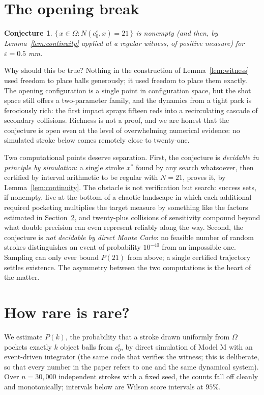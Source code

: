 \documentclass[11pt]{article}
\newtheorem{conjecture}{Conjecture}
\theoremstyle{definition}
\theoremstyle{remark}
\newcommand{\OO}{\Omega}
\begin{document}
\section{The opening break}
\label{sec:break}

\begin{conjecture}
\label{conj:break}
$\{\, x \in \OO : N(c_0^{\varepsilon}, x) = 21 \,\}$ is nonempty
(and then, by Lemma~\ref{lem:continuity} applied at a regular
witness, of positive measure) for $\varepsilon = 0.5$ mm.
\end{conjecture}

Why should this be true? Nothing in the construction of
Lemma~\ref{lem:witness} used freedom to place balls generously; it
used freedom to place them exactly. The opening configuration is a
single point in configuration space, but the shot space still offers
a two-parameter family, and the dynamics from a tight pack is
ferociously rich: the first impact sprays fifteen reds into a
recirculating cascade of secondary collisions. Richness is not a
proof, and we are honest that the conjecture is open even at the
level of overwhelming numerical evidence: no simulated stroke below
comes remotely close to twenty-one.

Two computational points deserve separation. First, the conjecture
is \emph{decidable in principle by simulation}: a single stroke
$x^{*}$ found by any search whatsoever, then certified by interval
arithmetic to be regular with $N = 21$, proves it, by
Lemma~\ref{lem:continuity}. The obstacle is not verification but
search: success sets, if nonempty, live at the bottom of a chaotic
landscape in which each additional required pocketing multiplies the
target measure by something like the factors estimated in
Section~\ref{sec:montecarlo}, and twenty-plus collisions of
sensitivity compound beyond what double precision can even represent
reliably along the way. Second, the conjecture is \emph{not
decidable by direct Monte Carlo}: no feasible number of random
strokes distinguishes an event of probability $10^{-40}$ from an
impossible one. Sampling can only ever bound $P(21)$ from above; a
single certified trajectory settles existence. The asymmetry between
the two computations is the heart of the matter.

\section{How rare is rare?}
\label{sec:montecarlo}

We estimate $P(k)$, the probability that a stroke drawn uniformly
from $\OO$ pockets exactly $k$ object balls from
$c_0^{\varepsilon}$, by direct simulation of Model M with an
event-driven integrator (the same code that verifies the witness;
this is deliberate, so that every number in the paper refers to one
and the same dynamical system). Over $n = 30{,}000$ independent
strokes with a fixed seed, the counts fall off cleanly and
monotonically; intervals below are Wilson score intervals at $95\%$.
\end{document}
